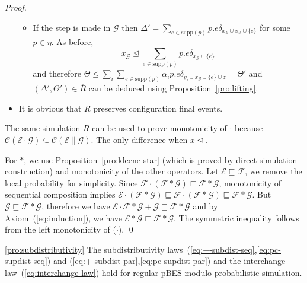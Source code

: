 \documentclass{llncs}
\newcommand{\C}{\mathcal{C}}
\newcommand{\EE}{\mathcal{E}}
\newcommand{\FF}{\mathcal{F}}
\newcommand{\G}{\mathcal{G}}
\newcommand{\refby}{\sqsubseteq}
\newcommand{\prefix}{\trianglelefteq}
\newcommand{\<}{\langle}
\renewcommand{\>}{\rangle}
\newcommand{\supp}{\mathrm{supp}}
\newcommand{\ov}[1]{\overline{#1}}
\begin{document}
\begin{proof}
\begin{itemize}
\begin{itemize}
\item If the step is made in $\G$ then $\Delta' = \sum_{e\in\supp(p)}p.e\delta_{x_\EE\cup x_\G\cup\{e\}}$ for some $p\in\eta$. As before, 
$$x_\G\prefix\sum_{e\in\supp(p)}p.e\delta_{x_\G\cup\{e\}}$$ and therefore $\Theta\prefix\sum_i\sum_{e\in\supp(p)}\alpha_ip.e\delta_{y_i\cup x_\G\cup\{e\}\cup z} = \Theta'$ and $(\Delta',\Theta')\in\ov R$ can be deduced using Proposition~\ref{pro:lifting}.
\end{itemize}
\item It is obvious that $R$ preserves configuration final events.
\end{itemize}
The same simulation $R$ can be used to prove monotonicity of $\cdot$ because $\C(\EE\cdot\G)\subseteq\C(\EE\|\G)$. The only difference when $x\prefix $.

For $*$, we use Proposition~\ref{pro:kleene-star} (which is proved by direct simulation construction) and monotonicity of the other operators. Let $\EE\refby\FF$, we remove the local probability for simplicity. Since $\FF\cdot(\FF*\G)\refby\FF*\G$, monotonicity of sequential composition implies $\EE\cdot(\FF*\G)\refby\FF\cdot(\FF*\G)\refby\FF*\G$. But $\G\refby\FF*\G$, therefore we have $\EE\cdot\FF*\G + \G\refby\FF*\G$ and by Axiom~(\ref{eq:induction}), we have $\EE*\G\refby\FF*\G$.  The symmetric inequality follows from the left monotonicity of ($\cdot$). \qed
\end{proof}

\begin{repproposition}{\ref{pro:subdistributivity}}
The subdistributivity laws~(\ref{eq:+-subdist-seq},\ref{eq:pc-supdist-seq}) and (\ref{eq:+-subdist-par},\ref{eq:pc-supdist-par}) and the interchange law~(\ref{eq:interchange-law}) hold for regular pBES modulo probabilistic simulation.
\end{repproposition}
\end{document}
